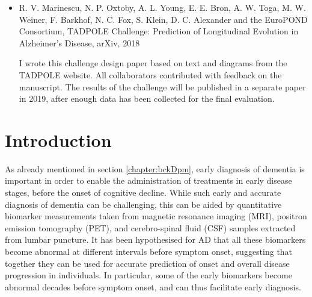 \begin{itemize}
\item  R. V. Marinescu, N. P. Oxtoby, A. L. Young, E. E. Bron, A. W. Toga, M. W. Weiner, F. Barkhof, N. C. Fox, S. Klein, D. C. Alexander and the EuroPOND Consortium, TADPOLE Challenge: Prediction of Longitudinal Evolution in Alzheimer's Disease, arXiv, 2018 

I wrote this challenge design paper based on text and diagrams from the TADPOLE website. All collaborators contributed with feedback on the manuscript. The results of the challenge will be published in a separate paper in 2019, after enough data has been collected for the final evaluation.
\end{itemize}

\section{Introduction}
\label{intro}

As already mentioned in section \ref{chapter:bckDpm}, early diagnosis of dementia is important in order to enable the administration of treatments in early disease stages, before the onset of cognitive decline. While such early and accurate diagnosis of dementia can be challenging, this can be aided by quantitative biomarker measurements taken from magnetic resonance imaging (MRI), positron emission tomography (PET), and cerebro-spinal fluid (CSF) samples extracted from lumbar puncture. It has been hypothesised for AD \cite{jack2010hypothetical,jack2013update,aisen2010clinical,frisoni2010clinical} that all these biomarkers become abnormal at different intervals before symptom onset, suggesting that together they can be used for accurate prediction of onset and overall disease progression in individuals. In particular, some of the early biomarkers become abnormal decades before symptom onset, and can thus facilitate early diagnosis. 

